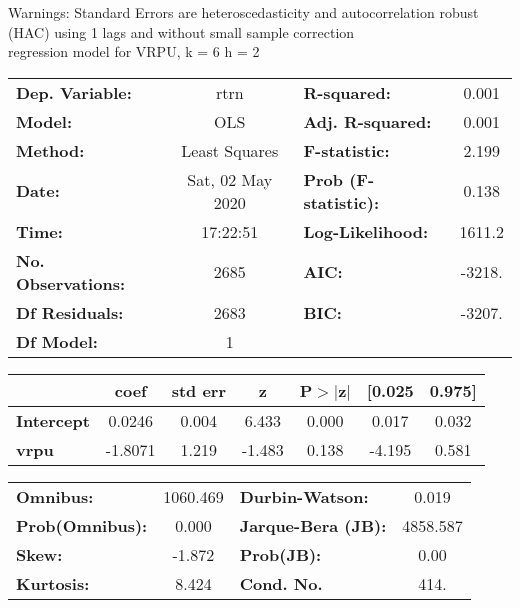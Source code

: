 Warnings: \newline
 [1] Standard Errors are heteroscedasticity and autocorrelation robust (HAC) using 1 lags and without small sample correction\\ 

regression model for VRPU, k = 6 h = 2\begin{center}
\begin{tabular}{lclc}
\toprule
\textbf{Dep. Variable:}    &       rtrn       & \textbf{  R-squared:         } &     0.001   \\
\textbf{Model:}            &       OLS        & \textbf{  Adj. R-squared:    } &     0.001   \\
\textbf{Method:}           &  Least Squares   & \textbf{  F-statistic:       } &     2.199   \\
\textbf{Date:}             & Sat, 02 May 2020 & \textbf{  Prob (F-statistic):} &    0.138    \\
\textbf{Time:}             &     17:22:51     & \textbf{  Log-Likelihood:    } &    1611.2   \\
\textbf{No. Observations:} &        2685      & \textbf{  AIC:               } &    -3218.   \\
\textbf{Df Residuals:}     &        2683      & \textbf{  BIC:               } &    -3207.   \\
\textbf{Df Model:}         &           1      & \textbf{                     } &             \\
\bottomrule
\end{tabular}
\begin{tabular}{lcccccc}
                   & \textbf{coef} & \textbf{std err} & \textbf{z} & \textbf{P$> |$z$|$} & \textbf{[0.025} & \textbf{0.975]}  \\
\midrule
\textbf{Intercept} &       0.0246  &        0.004     &     6.433  &         0.000        &        0.017    &        0.032     \\
\textbf{vrpu}      &      -1.8071  &        1.219     &    -1.483  &         0.138        &       -4.195    &        0.581     \\
\bottomrule
\end{tabular}
\begin{tabular}{lclc}
\textbf{Omnibus:}       & 1060.469 & \textbf{  Durbin-Watson:     } &    0.019  \\
\textbf{Prob(Omnibus):} &   0.000  & \textbf{  Jarque-Bera (JB):  } & 4858.587  \\
\textbf{Skew:}          &  -1.872  & \textbf{  Prob(JB):          } &     0.00  \\
\textbf{Kurtosis:}      &   8.424  & \textbf{  Cond. No.          } &     414.  \\
\bottomrule
\end{tabular}
\end{center}

